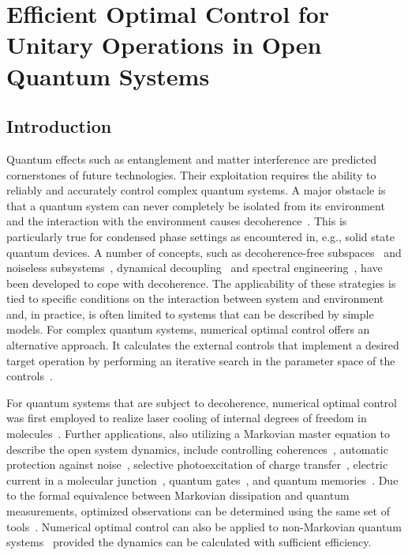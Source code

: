 \chapter[Efficient OC for Unitary Operations in Open Quantum Systems]{Efficient Optimal Control for Unitary Operations in Open Quantum Systems}
\label{chap:3states}

\section{Introduction}
\label{sec:3st_intro}

Quantum effects such as entanglement and matter interference are
predicted cornerstones of future technologies. Their exploitation
requires the ability to reliably and accurately control complex
quantum systems. A major obstacle is that a quantum system
can never completely be isolated from its environment and the
interaction with the environment causes
decoherence~\cite{BreuerBook}. This is particularly true for condensed
phase settings as encountered in, e.g., solid state quantum devices.
A number of concepts, such as decoherence-free subspaces~\cite{LidarPRL98}
and noiseless subsystems~\cite{LorenzaSci01}, dynamical
decoupling~\cite{LorenzaPRL99} and spectral
engineering~\cite{ClausenPRL10}, have been developed to cope with
decoherence. The applicability of these strategies is tied to specific
conditions on the interaction between system and environment and,
in practice, is often  limited to systems that can be described by simple
models. For complex quantum systems, numerical optimal control offers an
alternative approach. It calculates the external controls that
implement a desired target operation by performing an iterative search
in the parameter space of the controls~\cite{RiceBook}.

For quantum systems that are subject to decoherence, numerical optimal
control was first employed
to realize laser cooling of internal degrees of freedom in
molecules~\cite{BartanaJCP97}. Further applications, also utilizing a
Markovian master equation to describe the open system dynamics,
include controlling coherences~\cite{OhtsukiJCP99}, automatic
protection against noise~\cite{KallushPRA06}, selective
photoexcitation of charge transfer~\cite{TremblayPRA08},
electric current in a molecular junction~\cite{KleinekathoeferEPJB10},
quantum gates~\cite{ToSHJPB11}, and
quantum memories~\cite{GormanPRA12}. Due to the formal equivalence
between Markovian
dissipation and quantum measurements, optimized observations can be
determined using the same set of tools~\cite{ShuangJCP07}.
Numerical optimal control can also be applied to non-Markovian
quantum
systems~\cite{RebentrostPRL09,AsplundPRL11,SchmidtPRL11,FloetherNJP12}
provided the dynamics can be calculated with sufficient efficiency.

